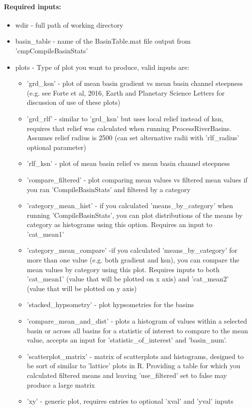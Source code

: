 \paragraph{Required inputs:}
\begin{itemize}
\item wdir - full path of working directory
\item basin\_table - name of the BasinTable.mat file output from 'cmpCompileBasinStats'
\item plots - Type of plot you want to produce, valid inputs are:
\begin{itemize}
\item 'grd\_ksn' - plot of mean basin gradient vs mean basin channel steepness (e.g. see Forte et al, 2016, Earth and Planetary 
Science Letters for discussion of use of these plots)
\item 'grd\_rlf' - similar to 'grd\_ksn' but uses local relief instead of ksn, requires that relief was calculated when running
ProcessRiverBasins. Assumes relief radius is 2500 (can set alternative radii with 'rlf\_radius' optional parameter)
\item 'rlf\_ksn' - plot of mean basin relief vs mean basin channel steepness
\item 'compare\_filtered' - plot comparing mean values vs filtered mean values if you ran 'CompileBasinStats' and filtered by a category
\item 'category\_mean\_hist' - if you calculated 'means\_by\_category' when running 'CompileBasinStats', you can plot distributions of the
means by category as histograms using this option. Requires an input to 'cat\_mean1'
\item 'category\_mean\_compare' -if you calculated 'means\_by\_category' for more than one value (e.g. both gradient and ksn), you can compare
the mean values by category using this plot. Requires inputs to both 'cat\_mean1' (value that will be plotted on x axis) 
and 'cat\_mean2' (value that will be plotted on y axis)
\item 'stacked\_hypsometry' - plot hypsometries for the basins
\item 'compare\_mean\_and\_dist' - plots a histogram of values within a selected basin or across all basins for a statistic of interest to 
compare to the mean value, accepts an input for 'statistic\_of\_interest' and 'basin\_num'.
\item 'scatterplot\_matrix' - matrix of scatterplots and histograms, designed to be sort of similar to 'lattice' plots in R. Providing a table 
for which you calculated filtered means and leaving 'use\_filtered' set to false may produce a large matrix 
\item 'xy' - generic plot, requires entries to optional 'xval' and 'yval' inputs
\end{itemize}
\end{itemize}

